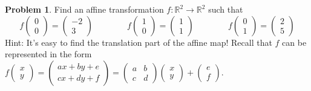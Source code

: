 \documentclass[11pt]{article}
\newcommand{\R}{{\mathbb R}}
\theoremstyle{definition}
\newtheorem{problem}{Problem}
\newenvironment{answer}{\par\bigskip\bgroup\color{darkblue}}{\egroup}
\begin{document}
\begin{answer}
\end{answer}




\begin{problem}Find an affine transformation $f\colon\R^2\to\R^2$ such that
$$
   f\begin{pmatrix} 0\\ 0 \end{pmatrix} = \begin{pmatrix} -2\\ 3 \end{pmatrix}\qquad\qquad
   f\begin{pmatrix} 1\\ 0 \end{pmatrix} = \begin{pmatrix} 1\\ 1 \end{pmatrix}\qquad\qquad
   f\begin{pmatrix} 0\\ 1 \end{pmatrix} = \begin{pmatrix} 2\\ 5 \end{pmatrix}
$$
Hint:  It's easy to find the translation\vadjust{\smallskip} part of the affine map!
Recall that $f$ can be represented in the form $f\begin{pmatrix} x\\ y \end{pmatrix} 
    = \begin{pmatrix} ax+by+e\\ cx+dy+f \end{pmatrix}
    = \begin{pmatrix} a& b\\ c&d \end{pmatrix}
          \begin{pmatrix} x\\ y \end{pmatrix} +
          \begin{pmatrix} e\\ f \end{pmatrix}$.
\end{problem}

\begin{answer}
\end{answer}
\end{document}
